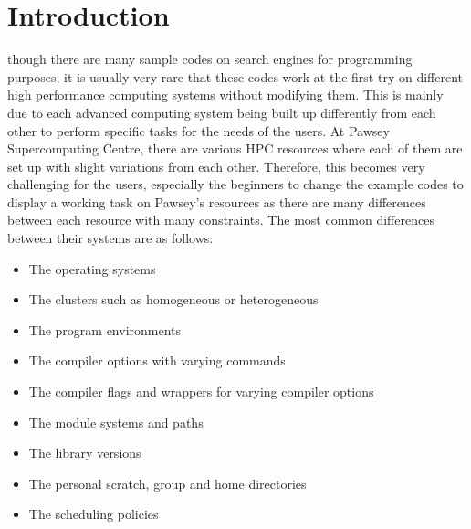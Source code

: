 
\section{Introduction}

 though there are many sample codes on search engines for programming purposes, it is usually very rare that these codes work at 
the first try on different high performance computing systems without modifying them. This is mainly due to each advanced computing system being built 
up differently from each other to perform specific tasks for the needs of the users. At Pawsey Supercomputing Centre, there are various HPC resources 
where each of them are set up with slight variations from each other. Therefore, this becomes very challenging for the users, especially the beginners 
to change the example codes to display a working task on Pawsey's resources as there are many differences between each resource with many constraints. 
The most common differences between their systems are as follows:

\begin{itemize}
\item The operating systems
\item The clusters such as homogeneous or heterogeneous
\item The program environments
\item The compiler options with varying commands
\item The compiler flags and wrappers for varying compiler options
\item The module systems and paths 
\item The library versions
\item The personal scratch, group and home directories
\item The scheduling policies
\end{itemize}

